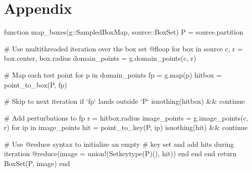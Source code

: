 
\section{Appendix}

\begin{jllisting}[language=julia, style=jlcodestyle, label=lst:boxmap, caption=Function to calculate $f(\mathcal{B})$]
    function map_boxes(g::SampledBoxMap, source::BoxSet)
        P = source.partition

        # Use multithreaded iteration over the box set
        @floop for box in source
            c, r = box.center, box.radius
            domain_points = g.domain_points(c, r)

            # Map each test point
            for p in domain_points
                fp = g.map(p)
                hitbox = point_to_box(P, fp)

                # Skip to next iteration if `fp` lands outside `P`
                isnothing(hitbox) && continue

                # Add perturbations to fp
                r = hitbox.radius
                image_points = g.image_points(c, r)
                for ip in image_points
                    hit = point_to_key(P, ip)
                    isnothing(hit) && continue

                    # Use @reduce syntax to initialize an empty
                    # key set and add hits during iteration
                    @reduce(image = union!(Set{keytype(P)}(), hit))
                end
            end
        end
        return BoxSet(P, image)
    end 
\end{jllisting}

